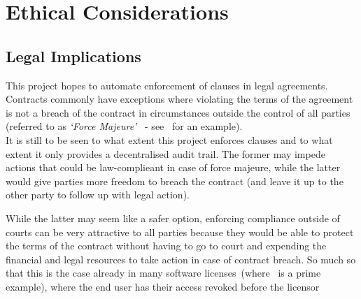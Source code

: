 
\chapter{Ethical Considerations}\label{ch:ethical}

\section{Legal Implications}\label{sec:legal-implications}

 This project hopes to automate enforcement of clauses in legal agreements.
Contracts commonly have exceptions where violating the terms of the agreement is not a breach of the contract in
circumstances outside the control of all parties (referred to as \textit{`Force Majeure'}~\cite{forceMajeureDefinition} -
see~\cite[]{jetbrainsEduLicence} for an example).\\

It is still to be seen to what extent this project enforces clauses and to what extent it only provides
a decentralised audit trail.
The former may impede actions that could be law-complieant in case of force majeure, while the latter
would give parties more freedom to breach the contract (and leave it up to the other party to follow up with legal
action).

While the latter may seem like a safer option, enforcing compliance outside of courts can be very attractive to all
parties because they would be able to protect the terms of the contract without having to go to court and expending the
financial and legal resources to take action in case of contract breach.
So much so that this is the case already in many software licenses~(where~\cite{jetbrainsEduLicence} is a prime example),
where the end user has their access revoked before the licensor
